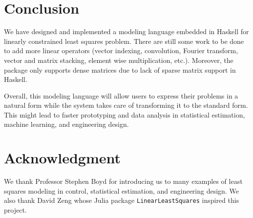 \documentclass[12pt]{article}
\begin{document}
\section{Conclusion}

We have designed and implemented a modeling language embedded in Haskell for
linearly constrained least squares problem.
There are still some work to be done to add more linear operators (vector
indexing, convolution, Fourier transform, vector and matrix stacking, element
wise multiplication, etc.).
Moreover, the package only supports dense matrices due to lack of sparse matrix
support in Haskell.

Overall, this modeling language will allow users to express their problems in a
natural form while the system takes care of transforming it to the standard
form.
This might lead to faster prototyping and data analysis in statistical
estimation, machine learning, and engineering design.

\section*{Acknowledgment}

We thank Professor Stephen Boyd for introducing us to many examples of least
squares modeling in control, statistical estimation, and engineering design.
We also thank David Zeng whose Julia package \verb|LinearLeastSquares|
\cite{zeng2014linearleastsquares} inspired this project.


\end{document}
